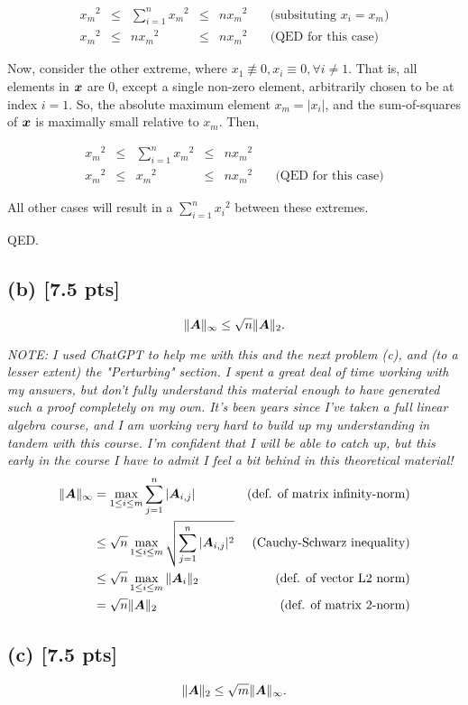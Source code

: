 \documentclass[twoside,10pt]{article}
\newcommand{\aln}[1]{\begin{align}#1\end{align}}
\newcommand{\s}{\enspace}
\begin{document}
\aln{
  {x_m}^2 &\leq &\sum_{i=1}^{n}{{x_m}^2} &\leq &n{x_m}^2 \s\s &\text{(subsituting $x_i = x_m$)}\\
  {x_m}^2 &\leq &n{x_m}^2 &\leq &n{x_m}^2 \s\s &\text{(QED for this case)}
}

Now, consider the other extreme, where $x_1 \not\equiv 0, x_i \equiv 0, \forall{i \neq 1}$.
That is, all elements in $\bm{x}$ are 0, except a single non-zero element, arbitrarily chosen to be at index $i=1$.
So, the absolute maximum element $x_m = |x_i|$, and the sum-of-squares of $\bm{x}$ is maximally small relative to $x_m$.
Then,

\aln{
  {x_m}^2 &\leq &\sum_{i=1}^{n}{{x_m}^2} &\leq &n{x_m}^2 \s\s\\
  {x_m}^2 &\leq &{x_m}^2 &\leq &n{x_m}^2 \s\s &\text{(QED for this case)}
}

All other cases will result in a $\sum_{i=1}^{n}{{x_i}^2}$ between these extremes.

QED.

\subsection*{(b) [7.5 pts]}
\begin{equation*}
  \|\bm{A}\|_{\infty} \leq \sqrt{n}\|\bm{A}\|_2.
\end{equation*}

\textit{
  NOTE: I used ChatGPT to help me with this and the next problem (c), and (to a lesser extent) the "Perturbing" section.
  I spent a great deal of time working with my answers, but don't fully understand this material enough to have generated such a proof completely on my own.
  It's been years since I've taken a full linear algebra course, and I am working very hard to build up my understanding in tandem with this course.
  I'm confident that I will be able to catch up, but this early in the course I have to admit I feel a bit behind in this theoretical material!
}
\aln{
  \|\mtx{A}\|_{\infty} &=\max_{1 \leq i \leq m}\sum_{j=1}^n |\mtx{A}_{i,j}| &\text{(def. of matrix infinity-norm)}\\
  &\leq \sqrt{n}\max_{1 \leq i \leq m}\sqrt{\sum_{j=1}^n |\mtx{A}_{i,j}|^2} &\text{(Cauchy-Schwarz inequality)}\\
  &\leq \sqrt{n}\max_{1 \leq i \leq m}\|\mtx{A}_i\|_{2} &\text{(def. of vector L2 norm)}\\
  &= \sqrt{n} \|\mtx{A}\|_2 &\text{(def. of matrix 2-norm)}
}

\subsection*{(c) [7.5 pts]}
\begin{equation*}
  \|\bm{A}\|_{2} \leq \sqrt{m}\|\bm{A}\|_{\infty}.
\end{equation*}
\end{document}

